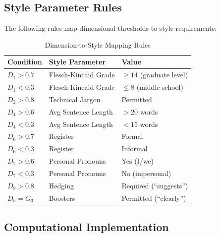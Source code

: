 \subsection{Style Parameter Rules}

The following rules map dimensional thresholds to style requirements:

\begin{table}[htbp]
\centering
\caption{Dimension-to-Style Mapping Rules}
\label{tab:style-rules}
\renewcommand{\arraystretch}{1.3}
\begin{tabular}{@{}lll@{}}
\toprule
\textbf{Condition} & \textbf{Style Parameter} & \textbf{Value} \\
\midrule
$D_1 > 0.7$ & Flesch-Kincaid Grade & $\geq 14$ (graduate level) \\
$D_1 < 0.3$ & Flesch-Kincaid Grade & $\leq 8$ (middle school) \\
$D_2 > 0.8$ & Technical Jargon & Permitted \\
$D_4 > 0.6$ & Avg Sentence Length & $> 20$ words \\
$D_4 < 0.3$ & Avg Sentence Length & $< 15$ words \\
$D_6 > 0.7$ & Register & Formal \\
$D_6 < 0.3$ & Register & Informal \\
$D_7 > 0.6$ & Personal Pronouns & Yes (I/we) \\
$D_7 < 0.3$ & Personal Pronouns & No (impersonal) \\
$D_8 > 0.8$ & Hedging & Required (``suggests'') \\
$D_5 = G_3$ & Boosters & Permitted (``clearly'') \\
\bottomrule
\end{tabular}
\end{table}

\subsection{Computational Implementation}

